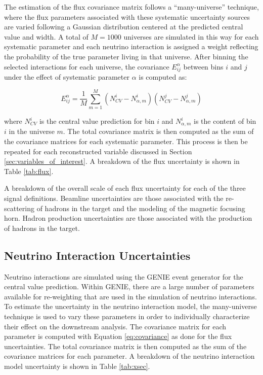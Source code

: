 The estimation of the flux covariance matrix follows a ``many-universe'' technique, where the flux parameters associated with these systematic uncertainty sources are varied following a Gaussian distribution centered at the predicted central value and width. A total of $M=1000$ universes are simulated in this way for each systematic parameter and each neutrino interaction is assigned a weight reflecting the probability of the true parameter living in that universe. After binning the selected interactions for each universe, the covariance $E_{ij}^\alpha$ between bins $i$ and $j$ under the effect of systematic parameter $\alpha$ is computed as:

\begin{equation}
    \label{eq:covariance}
    E_{ij}^{\alpha} = \frac{1}{M} \sum_{m=1}^M (N_{CV}^i - N_{\alpha, m}^i)(N_{CV}^j - N_{\alpha, m}^j)
\end{equation}

\noindent
where $N_{CV}^i$ is the central value prediction for bin $i$ and $N_{\alpha,m}^i$ is the content of bin $i$ in the universe $m$. The total covariance matrix is then computed as the sum of the covariance matrices for each systematic parameter. This process is then be repeated for each reconstructed variable discussed in Section \ref{sec:variables_of_interest}. A breakdown of the flux uncertainty is shown in Table \ref{tab:flux}.

\begin{table}
    \centering
    \caption{A breakdown of the overall scale of each flux uncertainty for each of the three signal definitions. Beamline uncertainties are those associated with the re-scattering of hadrons in the target and the modeling of the magnetic focusing horn. Hadron production uncertainties are those associated with the production of hadrons in the target.}
    
    \label{tab:flux} 
\end{table}

\subsection{Neutrino Interaction Uncertainties}
\label{sec:xsec}

Neutrino interactions are simulated using the GENIE event generator \cite{Andreopoulos2015} for the central value prediction. Within GENIE, there are a large number of parameters available for re-weighting that are used in the simulation of neutrino interactions. To estimate the uncertainty in the neutrino interaction model, the many-universe technique is used to vary these parameters in order to individually characterize their effect on the downstream analysis. The covariance matrix for each parameter is computed with Equation \ref{eq:covariance} as done for the flux uncertainties. The total covariance matrix is then computed as the sum of the covariance matrices for each parameter. A breakdown of the neutrino interaction model uncertainty is shown in Table \ref{tab:xsec}.

